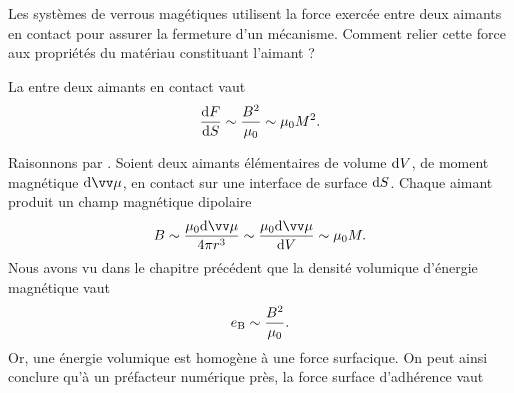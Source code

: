 \documentclass[12pt,fancy]{cours}
\begin{document}


Les systèmes de verrous magétiques utilisent la force exercée entre deux aimants en contact pour assurer la fermeture d'un mécanisme. Comment relier cette force aux propriétés du matériau constituant l'aimant ?
\begin{theorem}\label{form:}
  La  entre deux aimants en contact vaut
  \begin{equation*}
\frac{\mathrm{d} F}{\mathrm{d} S} \sim \frac{B^2}{\mu_0} \sim \mu_0 M^2.
\end{equation*}
\end{theorem}

\begin{demo}
Raisonnons par . Soient deux aimants élémentaires de volume $\mathrm{d} V$, de moment magnétique $\d \M$, en contact sur une interface de surface $\mathrm{d} S$. Chaque aimant produit un champ magnétique dipolaire 
\begin{equation}
  B \sim \frac{\mu_0 \d \M}{4\pi r^3} \sim \frac{\mu_0 \d \M}{\d V} \sim \mu_0 M.
\end{equation}
Nous avons vu dans le chapitre précédent que la densité volumique d'énergie magnétique vaut
\begin{equation}
e_{\rm B} \sim  \frac{B^2}{\mu_0}.
\end{equation}
 Or, une énergie volumique est homogène à une force surfacique. On peut ainsi conclure qu'à un préfacteur numérique près, la force surface d'adhérence vaut
\end{demo}
\end{document}
